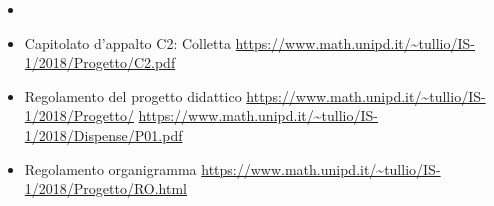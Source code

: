 \begin{itemize}
    \item \NdP
    \item Capitolato d'appalto C2: Colletta \newline \url{https://www.math.unipd.it/~tullio/IS-1/2018/Progetto/C2.pdf}
    \item Regolamento del progetto didattico 
    \newline \url{https://www.math.unipd.it/~tullio/IS-1/2018/Progetto/}
    \newline \url{https://www.math.unipd.it/~tullio/IS-1/2018/Dispense/P01.pdf}
    \item Regolamento organigramma \newline \url{https://www.math.unipd.it/~tullio/IS-1/2018/Progetto/RO.html}
\end{itemize}
